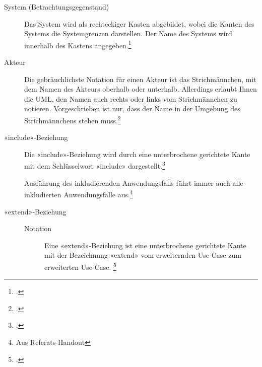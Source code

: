 \documentclass{lehramt-informatik-haupt}
\begin{document}
\begin{description}
\item[System (Betrachtungsgegenstand)]

Das System wird als rechteckiger Kasten abgebildet, wobei die Kanten des
Systems die Systemgrenzen darstellen. Der Name des Systems wird
innerhalb des Kastens angegeben.\footcite[Seite 249]{rupp}


%

\item[Akteur]

Die gebräuchlichste Notation für einen Akteur ist das Strichmännchen,
mit dem Namen des Akteurs oberhalb oder unterhalb. Allerdings erlaubt
Ihnen die UML, den Namen auch rechts oder links vom Strichmännchen zu
notieren. Vorgeschrieben ist nur, dass der Name in der Umgebung des
Strichmännchens stehen muss.\footcite[Seite 252]{rupp}


%

\item[«include»-Beziehung] Die «include»-Beziehung wird durch eine
unterbrochene gerichtete Kante mit dem Schlüs­selwort «include»
dargestellt.\footcite[Seite 256]{rupp}

Ausführung des inkludierenden Anwendungsfalls führt immer auch alle
inkludierten Anwendungsfälle aus.\footnote{Aus Referats-Handout}


%

\item[«extend»-Beziehung]

\begin{description}
\item[Notation]

Eine «extend»-Beziehung ist eine unterbrochene gerichtete Kante mit der
Bezeichnung «extend» vom erweiternden Use-Case zum erweiterten Use-Case.
\footcite[Seite 258]{rupp}


\end{description}
\end{description}
\end{document}
